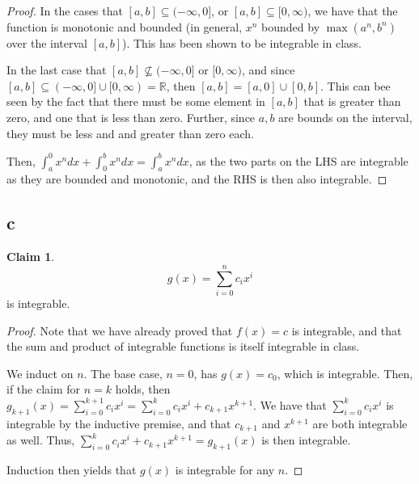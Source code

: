 \documentclass[12pt,letterpaper]{article}
\theoremstyle{definition}
\newtheorem*{claim}{Claim}
\newcommand{\R}{\mathbb{R}}
\begin{document}
\begin{proof}
  In the cases that $[a,b] \subseteq(-\infty, 0]$, or $[a,b] \subseteq[0,\infty)$, we have
  that the function is monotonic and bounded (in general, $x^n$ bounded by
  $\max(a^n,b^n)$ over the interval $[a,b]$). This has been shown to be integrable
  in class.

  In the last case that $[a,b] \nsubseteq (-\infty, 0]$ or $[0,\infty)$, and since
  $ [a,b] \subseteq (-\infty, 0] \cup [0,\infty) = \R$, then $[a,b] = [a,0] \cup
  [0,b]$. This can bee seen by the fact that there must be some element in $[a,b]$
  that is greater than zero, and one that is less than zero. Further, since $a,b$
  are bounds on the interval, they must be less and and greater than zero each.

  Then, $\int_a^0x^ndx + \int_0^bx^ndx = \int_a^bx^ndx$, as the two parts on the
  LHS are integrable as they are bounded and monotonic, and the RHS is then
  also integrable.
\end{proof}

\subsection*{c}

\begin{claim}
  \[
    g(x) = \sum_{i=0}^nc_ix^i 
  \]
  is integrable.
\end{claim}

\begin{proof}
  Note that we have already proved that $f(x) = c$ is integrable, and that the
  sum and product of integrable functions is itself integrable in class.

  We induct on $n$. The base case, $n = 0$, has $g(x) = c_0$, which is
  integrable. Then, if the claim for $n = k$ holds, then $g_{k+1}(x) =
  \sum_{i=0}^{k+1}c_ix^i = \sum_{i=0}^kc_ix^i + c_{k+1}x^{k+1}$. We have that
  $\sum_{i=0}^kc_ix^i$ is integrable by the inductive premise, and that $c_{k+1}$
  and $x^{k+1}$ are both integrable as well. Thus, $ \sum_{i=0}^kc_ix^i +
  c_{k+1}x^{k+1} = g_{k+1}(x)$ is then integrable.

  Induction then yields that $g(x)$ is integrable for any $n$.
\end{proof}
\end{document}
